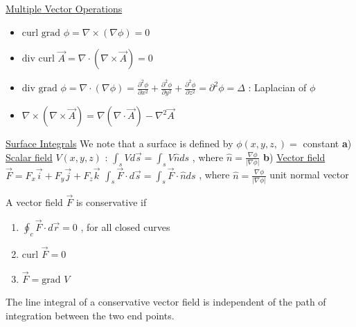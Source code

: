 \documentclass[12pt]{article}
\def\grad{\text{grad\ }} %
\def\div{\text{div\ }} %
\def\curl{\text{curl\ }} %
\begin{document}
\begin{flushleft}
	\textbullet \quad \uline{Multiple Vector Operations} 
	\begin{itemize}
	\item $\displaystyle \curl \grad \phi = \nabla \times ( \nabla \phi ) = 0$ 
	\item $\displaystyle \div \curl \vec{A} = \nabla \cdot ( \nabla \times \vec{A} ) = 0$ 
	\item $\displaystyle \div \grad{\phi} = \nabla \cdot ( \nabla \phi) = \frac{\partial^2 \phi}{\partial x^2} + \frac{\partial ^2 \phi}{\partial y^2} + \frac{\partial ^2 \phi}{\partial z^2} = \partial ^2 \phi = \Delta $  :  Laplacian of $\phi$ 
	\item $\displaystyle \nabla \times ( \nabla \times \vec{A} ) = \nabla ( \nabla \cdot \vec{A} ) - \nabla^2 \vec{A} $ \linebreak
	\end{itemize} 
	 
	\textbullet \quad \uline{Surface Integrals} \linebreak 
	We note that a surface is defined by $\phi (x,y,z,) = $ constant \linebreak 
	\textbf{a}) \uline{Scalar field} $V(x,y,z)$  :  \linebreak 
	$\displaystyle \int_s V d\vec{s} = \int_s V \hat{n} ds $ , where $\hat{n} = \frac{ \nabla \phi}{\left| \nabla \phi \right|} $ \linebreak 
	\textbf{b}) \uline{Vector field} $\displaystyle \vec{F} = F_x \vec{i} + F_y \vec{j} + F_z \vec{k} $ \linebreak 	
	$\displaystyle \int_s \vec{F} \cdot d\vec{s} = \int_s \vec{F} \cdot \hat{n} ds$ , \linebreak 
	where $\hat{n} = \frac{\nabla \phi}{\left| \nabla \phi \right|} $ unit normal vector \linebreak 
	
	\textbullet \quad A vector field $\vec{F}$ is conservative if  
	\begin{enumerate}
	\item $\displaystyle \oint_c \vec{F} \cdot d\vec{r} = 0$ , for all closed curves \linebreak 
	\item $\displaystyle \curl \vec{F} = 0$ 
	\item $\vec{F} = \grad V$ 
	\end{enumerate}	
	The line integral of a conservative vector field is independent of the path of integration between the two end points. \linebreak 


\end{flushleft}
\end{document}
